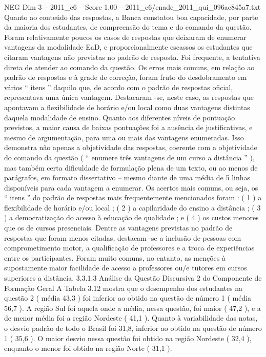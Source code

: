 \begin{textsample}{NEG Dim 3 – 2011\_c6 – Score 1.00 – 2011\_c6/enade\_2011\_qui\_096ae845a7.txt}
Quanto ao conteúdo das respostas, a Banca constatou boa capacidade, por parte da maioria dos estudantes, de compreensão do tema e do comando da questão.
Foram relativamente poucos os casos de respostas que deixaram de enumerar vantagens da modalidade EaD, e proporcionalmente escassos os estudantes que citaram vantagens não previstas no padrão de resposta.
Foi frequente, a tentativa direta de atender ao comando da questão.
Os erros mais comuns, em relação ao padrão de respostas e à grade de correção, foram fruto do desdobramento em vários “ itens ” daquilo que, de acordo com o padrão de respostas oficial, representava uma única vantagem.
Destacaram -se, neste caso, as respostas que apontavam a flexibilidade de horário e/ou local como duas vantagens distintas daquela modalidade de ensino.
Quanto aos diferentes níveis de pontuação previstos, a maior causa de baixas pontuações foi a ausência de justificativas, e mesmo de argumentação, para uma ou mais das vantagens enumeradas.
Isso demonstra não apenas a objetividade das respostas, coerente com a objetividade do comando da questão ( “ enumere três vantagens de um curso a distância ” ), mas também certa dificuldade de formulação plena de um texto, ou ao menos de parágrafos, em formato dissertativo – mesmo diante de uma média de 5 linhas disponíveis para cada vantagem a enumerar.
Os acertos mais comuns, ou seja, os “ itens ” do padrão de respostas mais frequentemente mencionados foram : ( 1 ) a flexibilidade de horário e/ou local ; ( 2 ) a capilaridade do ensino a distância ; ( 3 ) a democratização do acesso à educação de qualidade ; e ( 4 ) os custos menores que os de cursos presenciais.
Dentre as vantagens previstas no padrão de respostas que foram menos citadas, destacam -se a inclusão de pessoas com comprometimento motor, a qualificação de professores e a troca de experiências entre os participantes.
Foram muito comuns, no entanto, as menções à supostamente maior facilidade de acesso a professores ou/e tutores em cursos superiores a distância. 3.3.1.3 Análise da Questão Discursiva 2 do Componente de Formação Geral A Tabela 3.12 mostra que o desempenho dos estudantes na questão 2 ( média 43,3 ) foi inferior ao obtido na questão de número 1 ( média 56,7 ).
A região Sul foi aquela onde a média, nessa questão, foi maior ( 47,2 ), e a de menor média foi a região Nordeste ( 41,1 ).
Quanto à variabilidade das notas, o desvio padrão de todo o Brasil foi 31,8, inferior ao obtido na questão de número 1 ( 35,6 ).
O maior desvio nessa questão foi obtido na região Nordeste ( 32,4 ), enquanto o menor foi obtido na região Norte ( 31,1 ).

\end{textsample}
